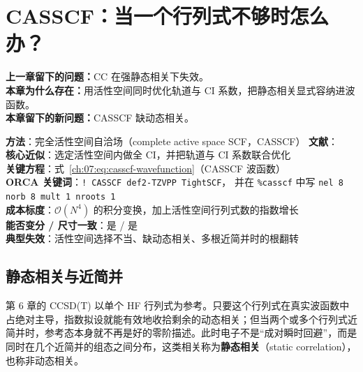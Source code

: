 
\section{CASSCF：当一个行列式不够时怎么办？}
\label{ch:07:sec:title}

\begin{problemchain}
\textbf{上一章留下的问题：}CC 在强静态相关下失效。\\
\textbf{本章为什么存在：}用活性空间同时优化轨道与 CI 系数，把静态相关显式容纳进波函数。\\
\textbf{本章留下的新问题：}CASSCF 缺动态相关。
\end{problemchain}

\begin{methodcard}
\textbf{方法}：完全活性空间自洽场（complete active space SCF，CASSCF）\quad
\textbf{文献}：\citep{roos1980,helgaker2000,szabo1996}\\
\textbf{核心近似}：选定活性空间内做全 CI，并把轨道与 CI 系数联合优化\\
\textbf{关键方程}：式~\eqref{ch:07:eq:casscf-wavefunction}（CASSCF 波函数）\\
\textbf{ORCA 关键词}：\texttt{! CASSCF def2-TZVPP TightSCF}，
并在 \texttt{\%casscf} 中写 \texttt{nel 8 norb 8 mult 1 nroots 1}\\
\textbf{成本标度}：$\mathcal{O}(N^4)$ 的积分变换，加上活性空间行列式数的指数增长\\
\textbf{能否变分 / 尺寸一致}：是 / 是\\
\textbf{典型失效}：活性空间选择不当、缺动态相关、多根近简并时的根翻转
\end{methodcard}

\subsection{静态相关与近简并}
\label{ch:07:sec:static}

第 6 章的 CCSD(T) 以单个 HF 行列式为参考。只要这个行列式在真实波函数中占绝对主导，指数拟设就能有效地收拾剩余的动态相关；但当两个或多个行列式近简并时，参考态本身就不再是好的零阶描述。此时电子不是“成对瞬时回避”，而是同时在几个近简并的组态之间分布，这类相关称为\textbf{静态相关}（static correlation），也称非动态相关。

